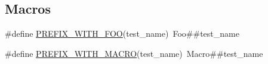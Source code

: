 \subsection*{Macros}
\begin{DoxyCompactItemize}
\item 
\#define \mbox{\hyperlink{_obj__test_2lib_2googletest-release-1_88_81_2googletest_2test_2googletest-param-test-test_8cc_a6414de581a925e7399b27c14e38f8a67}{P\+R\+E\+F\+I\+X\+\_\+\+W\+I\+T\+H\+\_\+\+F\+OO}}(test\+\_\+name)~Foo\#\#test\+\_\+name
\item 
\#define \mbox{\hyperlink{_obj__test_2lib_2googletest-release-1_88_81_2googletest_2test_2googletest-param-test-test_8cc_aeb9b224f65fb5b0b8f2323a6903d6a68}{P\+R\+E\+F\+I\+X\+\_\+\+W\+I\+T\+H\+\_\+\+M\+A\+C\+RO}}(test\+\_\+name)~Macro\#\#test\+\_\+name
\end{DoxyCompactItemize}
